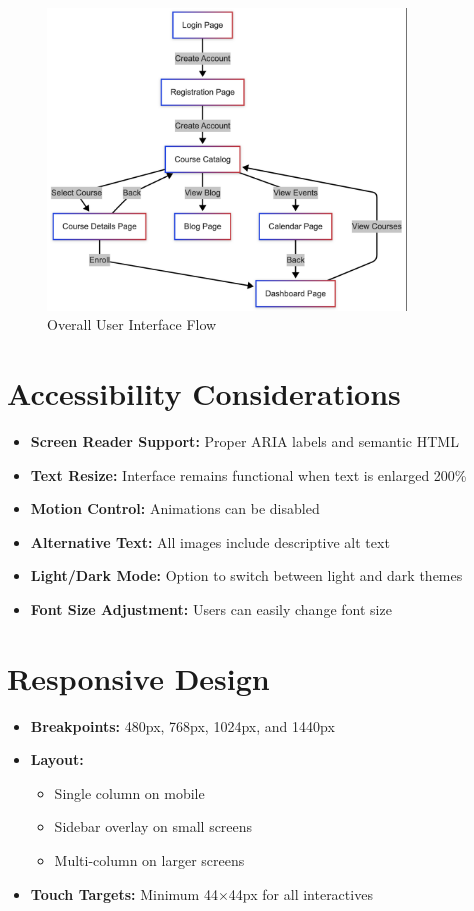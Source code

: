 \documentclass[a4paper, 11pt]{scrreprt}
\begin{document}
\begin{figure}[htbp]
    \centering
    \includegraphics[width=0.85\textwidth]{UI/UI_flow.png}
    \caption{Overall User Interface Flow}
\end{figure}

\section{Accessibility Considerations}
\begin{itemize}
    \item \textbf{Screen Reader Support:} Proper ARIA labels and semantic HTML
    \item \textbf{Text Resize:} Interface remains functional when text is enlarged 200\%
    \item \textbf{Motion Control:} Animations can be disabled
    \item \textbf{Alternative Text:} All images include descriptive alt text
    \item \textbf{Light/Dark Mode:} Option to switch between light and dark themes
    \item \textbf{Font Size Adjustment:} Users can easily change font size
\end{itemize}

\section{Responsive Design}
\begin{itemize}
    \item \textbf{Breakpoints:} 480px, 768px, 1024px, and 1440px
    \item \textbf{Layout:} 
    \begin{itemize}
        \item Single column on mobile
        \item Sidebar overlay on small screens
        \item Multi-column on larger screens
    \end{itemize}
    \item \textbf{Touch Targets:} Minimum 44$\times$44px for all interactives
\end{itemize}
\end{document}
